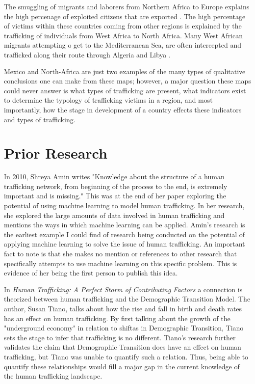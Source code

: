 \documentclass{article} %
\begin{document}
The smuggling of migrants and laborers from Northern Africa to Europe explains the high percenage of exploited citizens that are exported \parencite{AfricaExport}. The high percentage of victims within these countries coming from other regions is explained by the trafficking of individuals from West Africa to North Africa. Many West African migrants attempting o get to the Mediterranean Sea, are often intercepted and trafficked along their route through Algeria and Libya \parencite{AfricaImport}.

Mexico and North-Africa are just two examples of the many types of qualitative conclusions one can make from these maps; however, a major question these maps could never answer is what types of trafficking are present, what indicators exist to determine the typology of trafficking victims in a region, and most importantly, how the stage in development of a country effects these indicators and types of trafficking.


\section{Prior Research}


In 2010, Shreya Amin writes "Knowledge about the structure of a human trafficking network, from beginning of the process to the end, is extremely important and is missing.\parencite{firstML}" This was at the end of her paper exploring the potential of using machine learning to model human trafficking. In her research, she explored the large amounts of data involved in human trafficking and mentions the ways in which machine learning can be applied. Amin's research is the earliest example I could find of research being conducted on the potential of applying machine learning to solve the issue of human trafficking. An important fact to note is that she makes no mention or references to other research that specifically attempts to use machine learning on this specific problem. This is evidence of her being the first person to publish this idea.




In \emph{Human Trafficking: A Perfect Storm of Contributing Factors} \parencite{SlaveBook} a connection is theorized between human trafficking and the Demographic Transition Model. The author, Susan Tiano, talks about how the rise and fall in birth and death rates has an effect on human trafficking. By first talking about the growth of the "underground economy" in relation to shiftas in Demographic Transition, Tiano sets the stage to infer that trafficking is no different. Tiano's research further validates the claim that Demographic Transition does have an effect on human trafficking, but Tiano was unable to quantify such a relation. Thus, being able to quantify these relationships would fill a major gap in the current knowledge of the human trafficking landscape.
\end{document}
